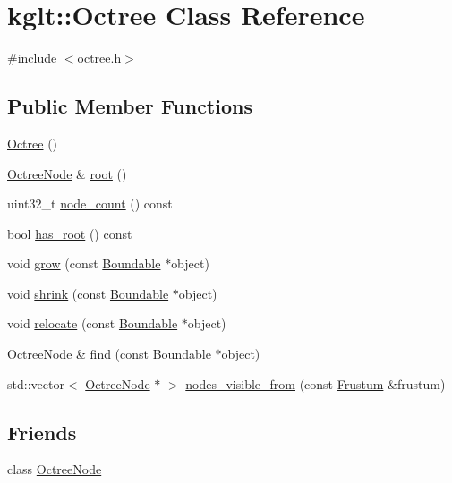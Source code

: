 \hypertarget{classkglt_1_1_octree}{\section{kglt\-:\-:Octree Class Reference}
\label{classkglt_1_1_octree}
}


{\ttfamily \#include $<$octree.\-h$>$}

\subsection*{Public Member Functions}
\begin{DoxyCompactItemize}
\item 
\hyperlink{classkglt_1_1_octree_ac74d2fa7ce292bcda41913881124f6f3}{Octree} ()
\item 
\hyperlink{classkglt_1_1_octree_node}{Octree\-Node} \& \hyperlink{classkglt_1_1_octree_af3ce34a320487077a38c887535473ac3}{root} ()
\item 
uint32\-\_\-t \hyperlink{classkglt_1_1_octree_a9ea9637caf95214e9f56b0f063952298}{node\-\_\-count} () const 
\item 
bool \hyperlink{classkglt_1_1_octree_a22a41ca7d5f0b37a9179929347203ac3}{has\-\_\-root} () const 
\item 
void \hyperlink{classkglt_1_1_octree_a9d1eebda7bbd1118f61ac3286bc5cf19}{grow} (const \hyperlink{classkglt_1_1_boundable}{Boundable} $\ast$object)
\item 
void \hyperlink{classkglt_1_1_octree_adb9fb30c3f58fd761302b275a7351bde}{shrink} (const \hyperlink{classkglt_1_1_boundable}{Boundable} $\ast$object)
\item 
void \hyperlink{classkglt_1_1_octree_a4d350064474290e80b010f6583e6a8ca}{relocate} (const \hyperlink{classkglt_1_1_boundable}{Boundable} $\ast$object)
\item 
\hyperlink{classkglt_1_1_octree_node}{Octree\-Node} \& \hyperlink{classkglt_1_1_octree_ac4097df980f03a2e9217181c197253c3}{find} (const \hyperlink{classkglt_1_1_boundable}{Boundable} $\ast$object)
\item 
std\-::vector$<$ \hyperlink{classkglt_1_1_octree_node}{Octree\-Node} $\ast$ $>$ \hyperlink{classkglt_1_1_octree_a7884b4165cc990532b32912740abb55a}{nodes\-\_\-visible\-\_\-from} (const \hyperlink{classkglt_1_1_frustum}{Frustum} \&frustum)
\end{DoxyCompactItemize}
\subsection*{Friends}
\begin{DoxyCompactItemize}
\item 
class \hyperlink{classkglt_1_1_octree_a8b24235b6b0c86da018f898416ecd2e8}{Octree\-Node}
\end{DoxyCompactItemize}


